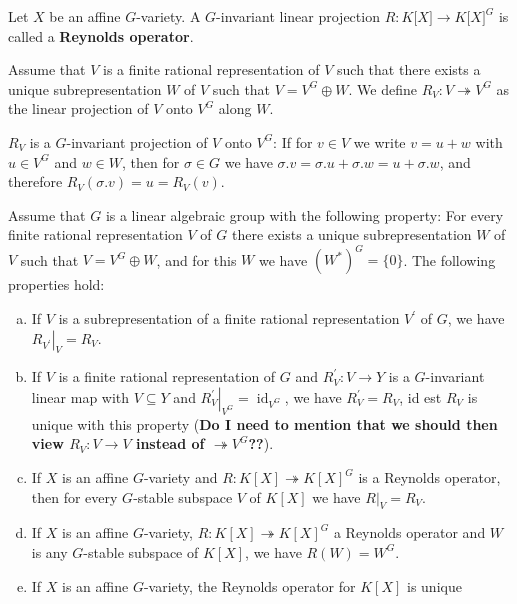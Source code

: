 
\begin{definition}
  Let $ X $ be an affine $G$-variety.
  A $ G $-invariant linear projection $R \colon K\lbrack X \rbrack \longrightarrow K\lbrack X \rbrack^G $ is called a \textbf{Reynolds operator}.
\end{definition}

\begin{definition}
  Assume that $V$ is a finite rational representation of $V$ such that there exists a unique subrepresentation $W$ of $V$ such that $V = V^G \oplus W$.
 We define $R_V \colon V \twoheadrightarrow V^G$ as the linear projection of $V$ onto $V^G$ along $W$.
\end{definition}

\begin{remark}
  $R_V$ is a $G$-invariant projection of $V$ onto $V^G$:
  If for $v \in V$ we write $v = u + w$ with $u \in V^G$ and $w \in W$, then for $\sigma \in G$ we have $\sigma.v = \sigma.u + \sigma.w = u + \sigma.w$, and therefore $R_V(\sigma.v) = u = R_V(v)$.
\end{remark}

\begin{lemma}\label{lamm}
  Assume that $G$ is a linear algebraic group with the following property:
  For every finite rational representation $V$ of $G$ there exists a unique subrepresentation $W$ of $V$ such that $V = V^G \oplus W$, and for this $W$ we have $(W^\ast)^G = \{0\}$.
  The following properties hold:
  \begin{enumerate}[(a)]
  \item If $V$ is a subrepresentation of a finite rational representation $V^\prime$ of $G$, we have $\left. R_{V^\prime} \right|_V = R_V$.
  \item If $V$ is a finite rational representation of $G$ and $R^\prime_V \colon V \longrightarrow Y$ is a $G$-invariant linear map with $V \subseteq Y$ and $ \left. R^\prime_V \right|_{V^G} = \operatorname{id}_{V^G}$, we have $R^\prime_V = R_V$, id est $R_V$ is unique with this property (\textbf{Do I need to mention that we should then view $R_V \colon V \longrightarrow V$ instead of $ \twoheadrightarrow V^G$??}).
  \item If $X$ is an affine $G$-variety and $R \colon K[X] \twoheadrightarrow K[X]^G$ is a Reynolds operator, then for every $G$-stable subspace $V$ of $K[X]$ we have $\left. R \right|_V = R_V$.
  \item If $X$ is an affine $G$-variety, $R \colon K[X] \twoheadrightarrow K[X]^G$ a Reynolds operator and $W$ is any $G$-stable subspace of $K[X]$, we have $R(W) = W^G$.
  \item If $X$ is an affine $G$-variety, the Reynolds operator for $K[X]$ is unique
  \end{enumerate}
\end{lemma}

